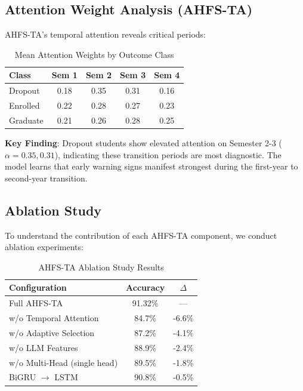 \documentclass[journal]{IEEEtran}
\begin{document}
\subsection{Attention Weight Analysis (AHFS-TA)}

AHFS-TA's temporal attention reveals critical periods:

\begin{table}[h]
\centering
\caption{Mean Attention Weights by Outcome Class}
\label{tab:attention}
\begin{tabular}{lcccc}
\toprule
\textbf{Class} & \textbf{Sem 1} & \textbf{Sem 2} & \textbf{Sem 3} & \textbf{Sem 4} \\
\midrule
Dropout & 0.18 & 0.35 & 0.31 & 0.16 \\
Enrolled & 0.22 & 0.28 & 0.27 & 0.23 \\
Graduate & 0.21 & 0.26 & 0.28 & 0.25 \\
\bottomrule
\end{tabular}
\end{table}

\textbf{Key Finding}: Dropout students show elevated attention on Semester 2-3 ($\alpha = 0.35, 0.31$), indicating these transition periods are most diagnostic. The model learns that early warning signs manifest strongest during the first-year to second-year transition.

\subsection{Ablation Study}

To understand the contribution of each AHFS-TA component, we conduct ablation experiments:

\begin{table}[h]
\centering
\caption{AHFS-TA Ablation Study Results}
\label{tab:ablation}
\begin{tabular}{lcc}
\toprule
\textbf{Configuration} & \textbf{Accuracy} & \textbf{$\Delta$} \\
\midrule
Full AHFS-TA & 91.32\% & --- \\
w/o Temporal Attention & 84.7\% & -6.6\% \\
w/o Adaptive Selection & 87.2\% & -4.1\% \\
w/o LLM Features & 88.9\% & -2.4\% \\
w/o Multi-Head (single head) & 89.5\% & -1.8\% \\
BiGRU $\rightarrow$ LSTM & 90.8\% & -0.5\% \\
\bottomrule
\end{tabular}
\end{table}
\end{document}
